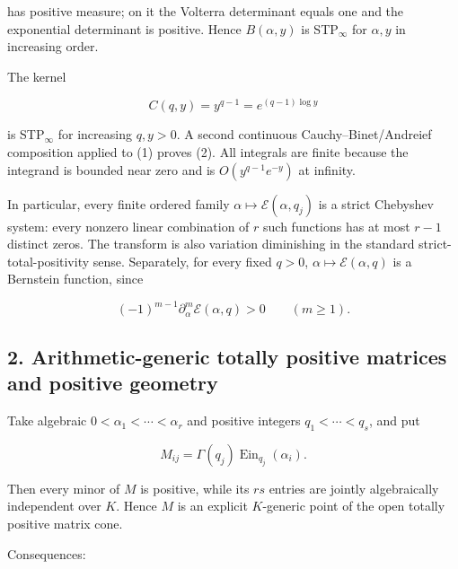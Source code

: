 \documentclass[11pt]{article}
\theoremstyle{keio}
\theoremstyle{definition}
\theoremstyle{remark}
\newcommand{\Ein}{\operatorname{Ein}}
\begin{document}
has positive measure; on it the Volterra determinant equals one and the
exponential determinant is positive. Hence \(B(\alpha,y)\) is STP\(_\infty\)
for \(\alpha,y\) in increasing order.

The kernel

\[
C(q,y)=y^{q-1}=e^{(q-1)\log y}
\]

is STP\(_\infty\) for increasing \(q,y>0\). A second continuous
Cauchy--Binet/Andreief composition applied to (1) proves (2). All integrals
are finite because the integrand is bounded near zero and is
\(O(y^{q-1}e^{-y})\) at infinity.

In particular, every finite ordered family
\(\alpha\mapsto\mathcal E(\alpha,q_j)\) is a strict Chebyshev system:
every nonzero linear combination of \(r\) such functions has at most
\(r-1\) distinct zeros. The transform is also variation diminishing in the
standard strict-total-positivity sense. Separately,
for every fixed \(q>0\), \(\alpha\mapsto\mathcal E(\alpha,q)\) is a
Bernstein function, since

\[
(-1)^{m-1}\partial_\alpha^m\mathcal E(\alpha,q)>0\qquad(m\ge1).
\]

\subsection{2. Arithmetic-generic totally positive matrices and positive geometry}

Take algebraic \(0<\alpha_1<\cdots<\alpha_r\) and positive integers
\(q_1<\cdots<q_s\), and put

\[
M_{ij}=\Gamma(q_j)\Ein_{q_j}(\alpha_i).
\]

Then every minor of \(M\) is positive, while its \(rs\) entries are jointly
algebraically independent over \(K\). Hence \(M\) is an explicit
\(K\)-generic point of the open totally positive matrix cone.

Consequences:
\end{document}
